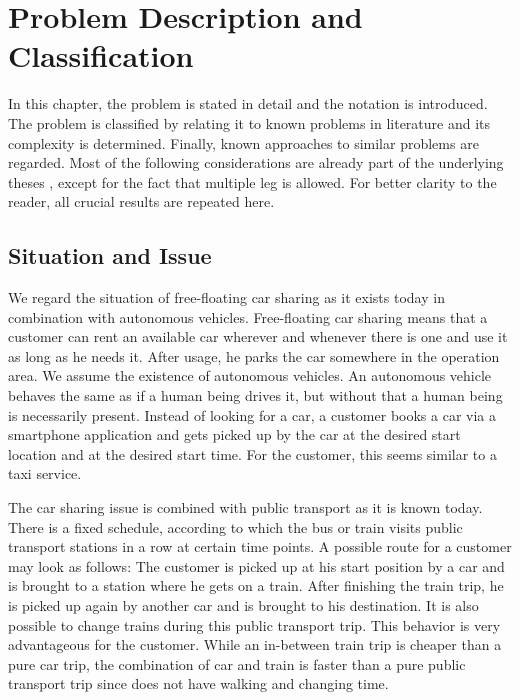 \chapter{Problem Description and Classification}
\label{ch:problem_description}

In this chapter, the problem is stated in detail and the notation is introduced. The problem is classified by relating it to known problems in literature and its complexity is determined. Finally, known approaches to similar problems are regarded. Most of the following considerations are already part of the underlying theses \cite{Kaiser_Knoll}, except for the fact that multiple leg is allowed. For better clarity to the reader, all crucial results are repeated here.

\section{Situation and Issue}

We regard the situation of free-floating car sharing as it exists today in combination with autonomous vehicles. Free-floating car sharing means that a customer can rent an available car wherever and whenever there is one and use it as long as he needs it. After usage, he parks the car somewhere in the operation area. We assume the existence of autonomous vehicles. An autonomous vehicle behaves the same as if a human being drives it, but without that a human being is necessarily present. Instead of looking for a car, a customer books a car via a smartphone application and gets picked up by the car at the desired start location and at the desired start time. For the customer, this seems similar to a taxi service. 

The car sharing issue is combined with public transport as it is known today. There is a fixed schedule, according to which the bus or train visits public transport stations in a row at certain time points. A possible route for a customer may look as follows: The customer is picked up at his start position by a car and is brought to a station where he gets on a train. After finishing the train trip, he is picked up again by another car and is brought to his destination. It is also possible to change trains during this public transport trip. This behavior is very advantageous for the customer. While an in-between train trip is cheaper than a pure car trip, the combination of car and train is faster than a pure public transport trip since does not have walking and changing time.

